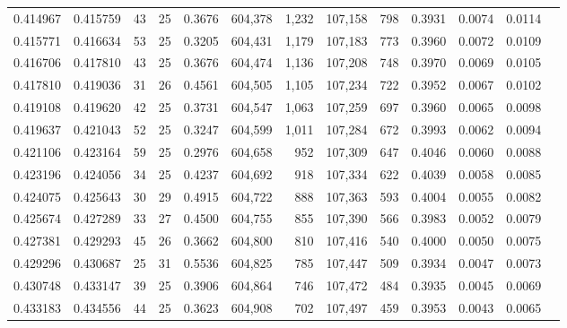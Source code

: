 \begin{tabular}{rrrrrrrrrrrrr}
0.414967 & 0.415759 &  43 &  25 &                                     0.3676 & 604,378 &   1,232 & 107,158 &     798 & 0.3931 & 0.0074 & 0.0114 \\
0.415771 & 0.416634 &  53 &  25 &                                     0.3205 & 604,431 &   1,179 & 107,183 &     773 & 0.3960 & 0.0072 & 0.0109 \\
0.416706 & 0.417810 &  43 &  25 &                                     0.3676 & 604,474 &   1,136 & 107,208 &     748 & 0.3970 & 0.0069 & 0.0105 \\
0.417810 & 0.419036 &  31 &  26 &                                     0.4561 & 604,505 &   1,105 & 107,234 &     722 & 0.3952 & 0.0067 & 0.0102 \\
0.419108 & 0.419620 &  42 &  25 &                                     0.3731 & 604,547 &   1,063 & 107,259 &     697 & 0.3960 & 0.0065 & 0.0098 \\
0.419637 & 0.421043 &  52 &  25 &                                     0.3247 & 604,599 &   1,011 & 107,284 &     672 & 0.3993 & 0.0062 & 0.0094 \\
0.421106 & 0.423164 &  59 &  25 &                                     0.2976 & 604,658 &     952 & 107,309 &     647 & 0.4046 & 0.0060 & 0.0088 \\
0.423196 & 0.424056 &  34 &  25 &                                     0.4237 & 604,692 &     918 & 107,334 &     622 & 0.4039 & 0.0058 & 0.0085 \\
0.424075 & 0.425643 &  30 &  29 &                                     0.4915 & 604,722 &     888 & 107,363 &     593 & 0.4004 & 0.0055 & 0.0082 \\
0.425674 & 0.427289 &  33 &  27 &                                     0.4500 & 604,755 &     855 & 107,390 &     566 & 0.3983 & 0.0052 & 0.0079 \\
0.427381 & 0.429293 &  45 &  26 &                                     0.3662 & 604,800 &     810 & 107,416 &     540 & 0.4000 & 0.0050 & 0.0075 \\
0.429296 & 0.430687 &  25 &  31 &                                     0.5536 & 604,825 &     785 & 107,447 &     509 & 0.3934 & 0.0047 & 0.0073 \\
0.430748 & 0.433147 &  39 &  25 &                                     0.3906 & 604,864 &     746 & 107,472 &     484 & 0.3935 & 0.0045 & 0.0069 \\
0.433183 & 0.434556 &  44 &  25 &                                     0.3623 & 604,908 &     702 & 107,497 &     459 & 0.3953 & 0.0043 & 0.0065 \\

\end{tabular}
